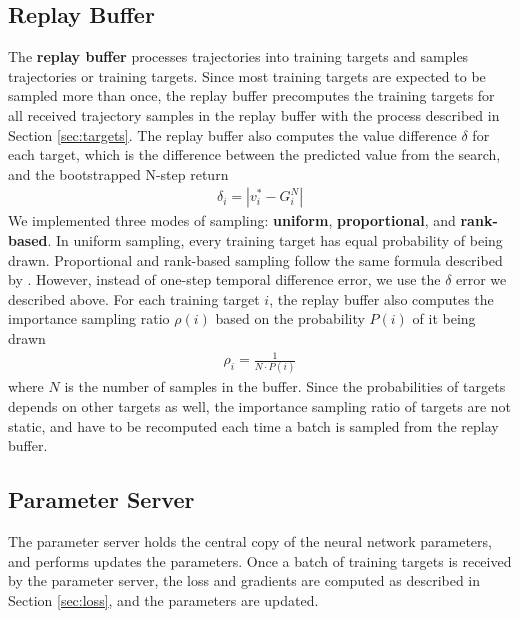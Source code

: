 \subsection{Replay Buffer} \label{sec:replay}
The \textbf{replay buffer} processes trajectories into training targets and samples trajectories or training targets.
Since most training targets are expected to be sampled more than once,
the replay buffer precomputes the training targets for all received trajectory samples in the replay buffer with the process described in Section \ref{sec:targets}.
The replay buffer also computes the value difference $\delta$ for each target,
which is the difference between the predicted value from the search, and the bootstrapped N-step return
\begin{align*}
    \delta_i = | v^*_i - G^N_i |
\end{align*}
We implemented three modes of sampling: \textbf{uniform}, \textbf{proportional}, and \textbf{rank-based}.
In uniform sampling, every training target has equal probability of being drawn.
Proportional and rank-based sampling follow the same formula described by \citeauthor{PrioritizedExperienceReplay_Schaul.Quan.ea_2016} \cite{PrioritizedExperienceReplay_Schaul.Quan.ea_2016}.
However, instead of one-step temporal difference error, we use the $\delta$ error we described above.
For each training target $i$, the replay buffer also computes the importance sampling ratio $\rho(i)$ based on the probability $P(i)$ of it being drawn
\begin{align*}
    \rho_{i}= \frac{1}{N \cdot P(i)}
\end{align*}
where $N$ is the number of samples in the buffer.
Since the probabilities of targets depends on other targets as well, the importance sampling ratio of targets are not static,
and have to be recomputed each time a batch is sampled from the replay buffer.

\subsection{Parameter Server} \label{sec:param_server}
The parameter server holds the central copy of the neural network parameters, and performs updates the parameters.
Once a batch of training targets is received by the parameter server, the loss and gradients are computed as described in Section \ref{sec:loss}, and the parameters are updated.

